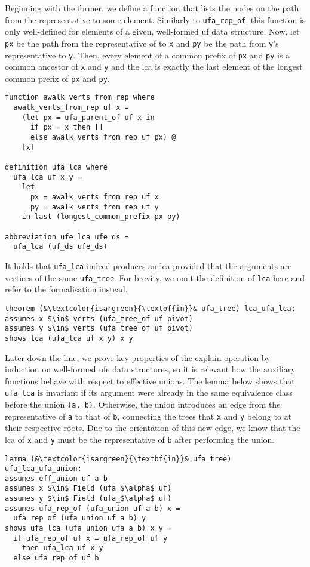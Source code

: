 \documentclass[
  sigplan,
  10pt,
  anonymous,
  review,
  ]{acmart}
\begin{document}
Beginning with the former, we define a function that lists the nodes on the path from the representative to some element.
Similarly to \lstinline|ufa_rep_of|, this function is only well-defined for elements of a given, well-formed \acrshort{uf} data structure.
Now, let \lstinline|px| be the path from the representative of to \lstinline|x| and \lstinline|py| be the path from \lstinline|y|'s representative to \lstinline|y|.
Then, every element of a common prefix of \lstinline|px| and \lstinline|py| is a common ancestor of \lstinline|x| and \lstinline|y| and
the \acrshort{lca} is exactly the last element of the longest common prefix of \lstinline|px| and \lstinline|py|. 
\begin{lstlisting}
function awalk_verts_from_rep where
  awalk_verts_from_rep uf x =
    (let px = ufa_parent_of uf x in
      if px = x then [] 
      else awalk_verts_from_rep uf px) @ 
    [x]

definition ufa_lca where
  ufa_lca uf x y =
    let
      px = awalk_verts_from_rep uf x
      py = awalk_verts_from_rep uf y
    in last (longest_common_prefix px py)

abbreviation ufe_lca ufe_ds =
  ufa_lca (uf_ds ufe_ds)
\end{lstlisting}
It holds that \lstinline|ufa_lca| indeed produces an \acrshort{lca} provided that the arguments are vertices of the same \lstinline|ufa_tree|.
For brevity, we omit the definition of \lstinline|lca| here and refer to the formalisation instead.
\begin{lstlisting}
theorem (&\textcolor{isargreen}{\textbf{in}}& ufa_tree) lca_ufa_lca:
assumes x $\in$ verts (ufa_tree_of uf pivot)
assumes y $\in$ verts (ufa_tree_of uf pivot)
shows lca (ufa_lca uf x y) x y
\end{lstlisting}
Later down the line, we prove key properties of the explain operation by induction on well-formed \acrshort{ufe} data structures, so it is relevant how the auxiliary functions behave with respect to effective unions.
The lemma below shows that \lstinline|ufa_lca| is invariant if its argument were already in the same equivalence class before the union \lstinline|(a, b)|.
Otherwise, the union introduces an edge from the representative of \lstinline|a| to that of \lstinline|b|, connecting the trees that \lstinline|x| and \lstinline|y| belong to at their respective roots.
Due to the orientation of this new edge, we know that the \acrshort{lca} of \lstinline|x| and \lstinline|y| must be the representative of \lstinline|b| after performing the union.
\begin{lstlisting}
lemma (&\textcolor{isargreen}{\textbf{in}}& ufa_tree) ufa_lca_ufa_union:
assumes eff_union uf a b
assumes x $\in$ Field (ufa_$\alpha$ uf) 
assumes y $\in$ Field (ufa_$\alpha$ uf)
assumes ufa_rep_of (ufa_union uf a b) x =
  ufa_rep_of (ufa_union uf a b) y
shows ufa_lca (ufa_union ufa a b) x y =
  if ufa_rep_of uf x = ufa_rep_of uf y
    then ufa_lca uf x y
  else ufa_rep_of uf b
\end{lstlisting}
\end{document}
